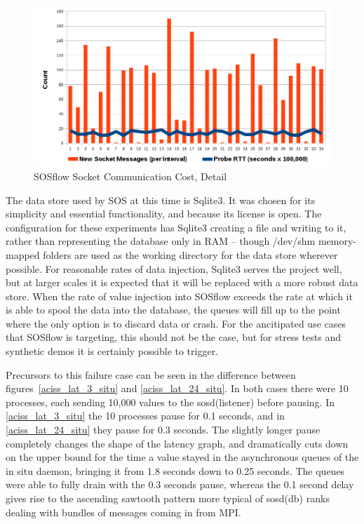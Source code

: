 \begin{figure}[!t]
\centering
\includegraphics[width=5in]{images/icebox_api_cost_zoom.png}
\caption{SOSflow Socket Communication Cost, Detail}
\label{sock_cost_detail}
\end{figure}


The data store used by SOS at this time is Sqlite3. It was chosen for
its simplicity and essential functionality, and because its license is
open. The configuration for these experiments has Sqlite3 creating a
file and writing to it, rather than representing the database only in
RAM -- though /dev/shm memory-mapped folders are used as the working
directory for the data store wherever possible. For reasonable rates
of data injection, Sqlite3 serves the project well, but at larger
scales it is expected that it will be replaced with a more robust data
store.  When the rate of value injection into SOSflow exceeds the rate
at which it is able to spool the data into the database, the queues
will fill up to the point where the only option is to discard data or
crash. For the ancitipated use cases that SOSflow is targeting, this
should not be the case, but for stress tests and synthetic demos it
is certainly possible to trigger.

Precursors to this failure case can be seen in the difference between
figures~\ref{aciss_lat_3_situ} and \ref{aciss_lat_24_situ}. In both
cases there were 10 processes, each sending 10,000 values to the
sosd(listener) before pausing. In \ref{aciss_lat_3_situ} the 10
processes pause for 0.1 seconds, and in \ref{aciss_lat_24_situ} they
pause for 0.3 seconds.  The slightly longer pause completely changes
the shape of the latency graph, and dramatically cuts down on the
upper bound for the time a value stayed in the asynchronous queues of
the in situ daemon, bringing it from 1.8 seconds down to 0.25
seconds. The queues were able to fully drain with the 0.3 seconds
pause, whereas the 0.1 second delay gives rise to the ascending
sawtooth pattern more typical of sosd(db) ranks dealing with bundles
of messages coming in from MPI.

